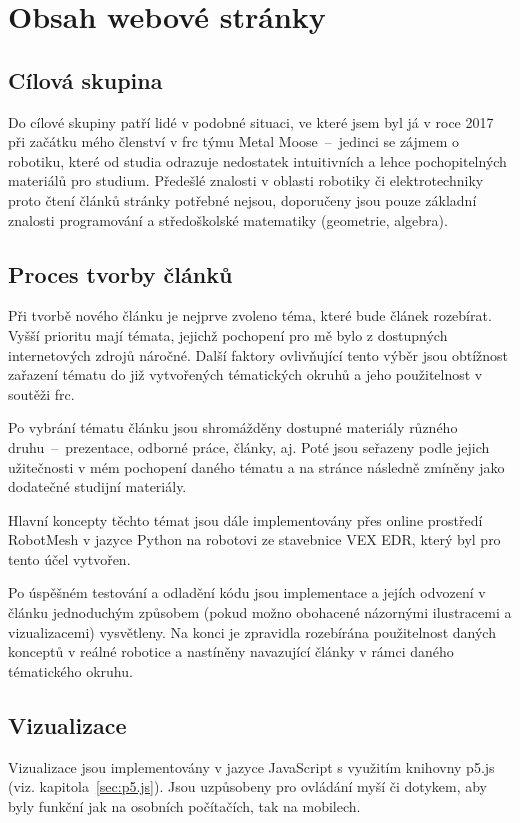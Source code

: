 \documentclass[a4paper, 12pt]{article}
\newcommand*{\fullref}[1]{\hyperref[{#1}]{\ref*{#1}}}
\begin{document}
  \section{Obsah webové stránky}

  \subsection{Cílová skupina}
  Do cílové skupiny patří lidé v podobné situaci, ve které jsem byl já v roce 2017 při začátku mého členství v \gls{frc} týmu Metal Moose~--~jedinci se zájmem o robotiku, které od studia odrazuje nedostatek intuitivních a lehce pochopitelných materiálů pro studium. Předešlé znalosti v oblasti robotiky či elektrotechniky proto čtení článků stránky potřebné nejsou, doporučeny jsou pouze základní znalosti programování a středoškolské matematiky (geometrie, algebra).


  \subsection{Proces tvorby článků} \label{sec:Proces tvorby článků}
  Při tvorbě nového článku je nejprve zvoleno téma, které bude článek rozebírat. Vyšší prioritu mají témata, jejichž pochopení pro mě bylo z dostupných internetových zdrojů náročné. Další faktory ovlivňující tento výběr jsou obtížnost zařazení tématu do již vytvořených tématických okruhů a jeho použitelnost v soutěži \gls{frc}.

  Po vybrání tématu článku jsou shromážděny dostupné materiály různého druhu~--~prezentace, odborné práce, články, aj. Poté jsou seřazeny podle jejich užitečnosti v mém pochopení daného tématu a na stránce následně zmíněny jako dodatečné studijní materiály.

  Hlavní koncepty těchto témat jsou dále implementovány přes online prostředí RobotMesh v jazyce Python na robotovi ze stavebnice VEX EDR, který byl pro tento účel vytvořen.


  Po úspěšném testování a odladění kódu jsou implementace a jejích odvození v článku jednoduchým způsobem (pokud možno obohacené názornými ilustracemi a vizualizacemi) vysvětleny. Na konci je zpravidla rozebírána použitelnost daných konceptů v reálné robotice a nastíněny navazující články v rámci daného tématického okruhu.


  \subsection{Vizualizace} \label{sec:Vizualizace}
  Vizualizace jsou implementovány v jazyce JavaScript s využitím knihovny p5.js (viz. kapitola~\fullref{sec:p5.js}). Jsou uzpůsobeny pro ovládání myší či dotykem, aby byly funkční jak na osobních počítačích, tak na mobilech.
\end{document}
